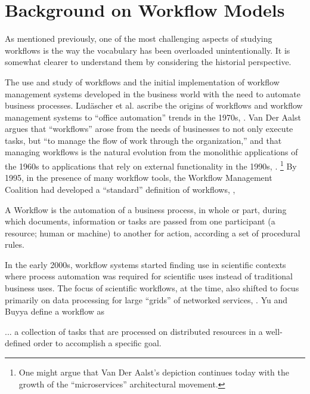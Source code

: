 \section{Background on Workflow Models}\label{workflows}

As mentioned previously, one of the most challenging aspects of studying
workflows is the way the vocabulary has been overloaded unintentionally.
It is somewhat clearer to understand them by considering the historial
perspective.

The use and study of workflows and the initial implementation of
workflow management systems developed in the business world with the
need to automate business processes. Lud\"{a}scher et al. ascribe the
origins of workflows and workflow management systems to ``office
automation'' trends in the 1970s, \cite{ludascher_scientific_2006}. Van Der
Aalst argues that ``workflows'' arose from the needs of businesses to not only
execute tasks, but ``to manage the flow of work through the
organization,'' and that managing workflows is the natural evolution
from the monolithic applications of the 1960s to applications that rely
on external functionality in the 1990s, \cite{van_der_aalst_application_1998}.
\footnote{One might argue that Van Der Aalst's depiction continues today with the
growth of the ``microservices'' architectural movement.} By 1995, in the
presence of many workflow tools, the Workflow Management Coalition had developed a ``standard'' definition of
workflows, \cite{hollingsworth_workflow_1993},

\begin{displayquote}
A Workflow is the automation of a business process, in whole or part, during
which documents, information or tasks are passed from one participant (a 
resource; human or machine) to another for action, according a set of 
procedural rules. 
\end{displayquote}

In the early 2000s, workflow systems started finding use in scientific
contexts where process automation was required for scientific uses
instead of traditional business uses. The focus of scientific workflows,
at the time, also shifted to focus primarily on data processing for
large ``grids'' of networked services, \cite{yu_taxonomy_2005}. Yu and Buyya
define a workflow as

\begin{displayquote}
... a collection of tasks that are processed on distributed resources in a
well-defined order to accomplish a specific goal.
\end{displayquote}

